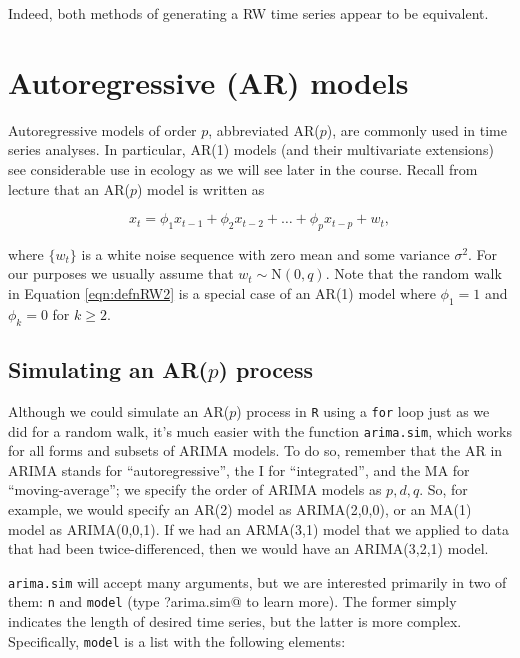 \noindent Indeed, both methods of generating a RW time series appear to be equivalent.


\section{Autoregressive (AR) models}

Autoregressive models of order $p$, abbreviated AR($p$), are commonly used in time series analyses.  In particular, AR(1) models (and their multivariate extensions) see considerable use in ecology as we will see later in the course.  Recall from lecture that an AR($p$) model is written as

\begin{equation}\label{eqn:defnARp}
  x_t = \phi_1 x_{t-1} + \phi_2 x_{t-2} + \dots + \phi_p x_{t-p} + w_t,
\end{equation}

\noindent where $\{w_t\}$ is a white noise sequence with zero mean and some variance $\sigma^2$.  For our purposes we usually assume that $w_t \sim \text{N}(0,q)$.  Note that the random walk in Equation \eqref{eqn:defnRW2} is a special case of an AR(1) model where $\phi_1=1$ and $\phi_k=0$ for $k \geq 2$.

\subsection{Simulating an AR($p$) process}

Although we could simulate an AR($p$) process in \texttt{R} using a \texttt{for} loop just as we did for a random walk, it's much easier with the function \texttt{arima.sim}, which works for all forms and subsets of ARIMA models.  To do so, remember that the AR in ARIMA stands for ``autoregressive'', the I for ``integrated'', and the MA for ``moving-average''; we specify the order of ARIMA models as $p,d,q$.  So, for example, we would specify an AR(2) model as ARIMA(2,0,0), or an MA(1) model as ARIMA(0,0,1).  If we had an ARMA(3,1) model that we applied to data that had been twice-differenced, then we would have an ARIMA(3,2,1) model. 

\texttt{arima.sim} will accept many arguments, but we are interested primarily in two of them: \texttt{n} and \texttt{model} (type \verb@?arima.sim@ to learn more).  The former simply indicates the length of desired time series, but the latter is more complex.  Specifically, \texttt{model} is a list with the following elements:

